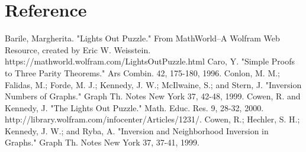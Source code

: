 \documentclass[
  manuscript=article,  %
  layout=preprint,  %
  year=20xx,
  volume=x,
]{extra/joas}
\begin{document}
% 


\section{Reference}
\renewcommand{\section}[2]{} 
\begin{thebibliography}{20}

    Barile, Margherita. "Lights Out Puzzle." From MathWorld--A Wolfram Web Resource, created by Eric W. Weisstein. https://mathworld.wolfram.com/LightsOutPuzzle.html
    Caro, Y. "Simple Proofs to Three Parity Theorems." Ars Combin. 42, 175-180, 1996.
    Conlon, M. M.; Falidas, M.; Forde, M. J.; Kennedy, J. W.; McIlwaine, S.; and Stern, J. "Inversion Numbers of Graphs." Graph Th. Notes New York 37, 42-48, 1999.
    Cowen, R. and Kennedy, J. "The Lights Out Puzzle." Math. Educ. Res. 9, 28-32, 2000. http://library.wolfram.com/infocenter/Articles/1231/.
    Cowen, R.; Hechler, S. H.; Kennedy, J. W.; and Ryba, A. "Inversion and Neighborhood Inversion in Graphs." Graph Th. Notes New York 37, 37-41, 1999.
\end{thebibliography}
\end{document}
